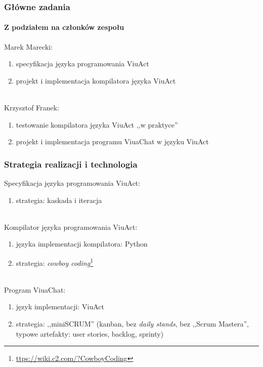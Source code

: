 \documentclass[aspectratio=169]{beamer}
\begin{document}
\begin{frame}
    \frametitle{Główne zadania}
    \framesubtitle{Z podziałem na członków zespołu}

    Marek Marecki:
    \begin{enumerate}
        \item specyfikacja języka programowania ViuAct
        \item projekt i implementacja kompilatora języka ViuAct
    \end{enumerate}

    ~\\

    Krzysztof Franek:
    \begin{enumerate}
        \item testowanie kompilatora języka ViuAct ,,w praktyce''
        \item projekt i implementacja programu ViuaChat w języku ViuAct
    \end{enumerate}
\end{frame}

\begin{frame}
    \frametitle{Strategia realizacji i technologia}

    Specyfikacja języka programowania ViuAct:
    \begin{enumerate}
        \item strategia: kaskada i iteracja
    \end{enumerate}

    ~\\

    Kompilator języka programowania ViuAct:
    \begin{enumerate}
        \item języka implementacji kompilatora: Python
        \item strategia: \emph{cowboy coding}\footnote{\url{ttps://wiki.c2.com/?CowboyCoding}}
    \end{enumerate}

    ~\\

    Program ViuaChat:
    \begin{enumerate}
        \item język implementacji: ViuAct
        \item strategia: ,,miniSCRUM'' (kanban, bez \emph{daily stands}, bez
            ,,Scrum Mastera'', typowe artefakty: user stories, backlog, sprinty)
    \end{enumerate}
\end{frame}
\end{document}
